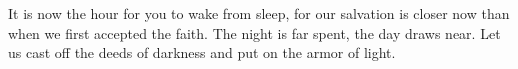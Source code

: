 
\lettrine{I}{}t is now the hour for you to wake from sleep, for our salvation is closer now than when we first accepted the faith. The night is far spent, the day draws near. Let us cast off the deeds of darkness and put on the armor of light.